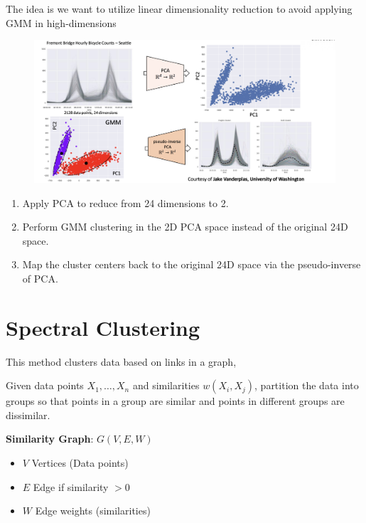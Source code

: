 \documentclass[11pt]{article}
\begin{document}
\medskip

The idea is we want to utilize linear dimensionality reduction to avoid applying GMM in high-dimensions

\begin{figure}[h]
	\centering
	\includegraphics[width=1\textwidth]{../imgs/high-low-dim.png} %
\end{figure}

\begin{enumerate}
	\item Apply PCA to reduce from 24 dimensions to 2.

	\item Perform GMM clustering in the 2D PCA space instead of the original 24D space. 

	\item Map the cluster centers back to the original 24D space via the pseudo-inverse of PCA. 
\end{enumerate}


\section*{Spectral Clustering}
This method clusters data based on links in a graph,

Given data points \( X_1, \dots, X_n \) and similarities \( w(X_i, X_j) \), partition the data into groups so that points in a group are similar and points in different groups are dissimilar.

\medskip

\textbf{Similarity Graph}: \( G(V, E, W) \) 
\begin{itemize}
  \item \( V \) Vertices (Data points)
  \item \( E \) Edge if similarity \( > 0 \)
  \item \( W \) Edge weights (similarities)
\end{itemize}
\end{document}
